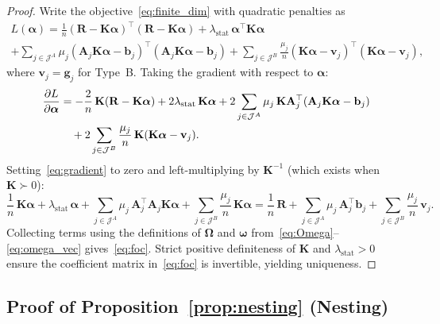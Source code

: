 \begin{proof}
Write the objective~\eqref{eq:finite_dim} with quadratic penalties as
\begin{multline}
\label{eq:obj_expanded}
L(\boldsymbol{\alpha})
= \frac{1}{n}(\mathbf{R} - \mathbf{K}\boldsymbol{\alpha})^\top
  (\mathbf{R} - \mathbf{K}\boldsymbol{\alpha})
+ \lambda_{\mathrm{stat}}\,\boldsymbol{\alpha}^\top\mathbf{K}\boldsymbol{\alpha} \\
+ \sum_{j \in \mathcal{J}^A} \mu_j
  (\mathbf{A}_j\mathbf{K}\boldsymbol{\alpha} - \mathbf{b}_j)^\top
  (\mathbf{A}_j\mathbf{K}\boldsymbol{\alpha} - \mathbf{b}_j)
+ \sum_{j \in \mathcal{J}^{B}} \frac{\mu_j}{n}
  (\mathbf{K}\boldsymbol{\alpha} - \mathbf{v}_j)^\top
  (\mathbf{K}\boldsymbol{\alpha} - \mathbf{v}_j),
\end{multline}
where $\mathbf{v}_j = \mathbf{g}_j$ for Type~B.
Taking the gradient with respect to $\boldsymbol{\alpha}$:
\begin{align}
\frac{\partial L}{\partial \boldsymbol{\alpha}}
&= -\frac{2}{n}\,\mathbf{K}(\mathbf{R} - \mathbf{K}\boldsymbol{\alpha})
+ 2\lambda_{\mathrm{stat}}\,\mathbf{K}\boldsymbol{\alpha}
+ 2\sum_{j \in \mathcal{J}^A} \mu_j\,\mathbf{K}\mathbf{A}_j^\top
  (\mathbf{A}_j\mathbf{K}\boldsymbol{\alpha} - \mathbf{b}_j)
\notag \\
&\quad + 2\sum_{j \in \mathcal{J}^{B}} \frac{\mu_j}{n}\,\mathbf{K}
  (\mathbf{K}\boldsymbol{\alpha} - \mathbf{v}_j).
\label{eq:gradient}
\end{align}
Setting~\eqref{eq:gradient} to zero and left-multiplying by $\mathbf{K}^{-1}$
(which exists when $\mathbf{K} \succ 0$):
\[
\frac{1}{n}\,\mathbf{K}\boldsymbol{\alpha}
+ \lambda_{\mathrm{stat}}\,\boldsymbol{\alpha}
+ \sum_{j \in \mathcal{J}^A} \mu_j\,\mathbf{A}_j^\top\mathbf{A}_j
  \mathbf{K}\boldsymbol{\alpha}
+ \sum_{j \in \mathcal{J}^{B}} \frac{\mu_j}{n}\,\mathbf{K}\boldsymbol{\alpha}
= \frac{1}{n}\,\mathbf{R}
+ \sum_{j \in \mathcal{J}^A} \mu_j\,\mathbf{A}_j^\top\mathbf{b}_j
+ \sum_{j \in \mathcal{J}^{B}} \frac{\mu_j}{n}\,\mathbf{v}_j.
\]
Collecting terms using the definitions of $\boldsymbol{\Omega}$
and $\boldsymbol{\omega}$ from~\eqref{eq:Omega}--\eqref{eq:omega_vec}
gives~\eqref{eq:foc}.
Strict positive definiteness of $\mathbf{K}$ and $\lambda_{\mathrm{stat}} > 0$
ensure the coefficient matrix in~\eqref{eq:foc} is invertible, yielding
uniqueness.
\end{proof}

\subsection{Proof of Proposition~\ref{prop:nesting} (Nesting)}

